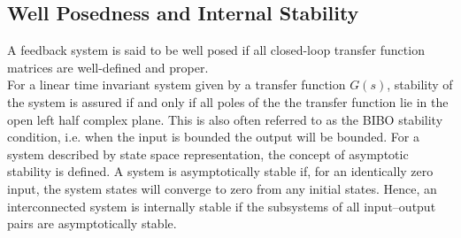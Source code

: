 \documentclass[a4paper,12pt]{article}
\newcommand\norm[1]{\left\lVert#1\right\rVert}
\begin{document}
		\subsection{Well Posedness and Internal Stability}
		A feedback system is said to be well posed if all closed-loop transfer function matrices are well-defined and proper. \\
		For a linear time invariant system given by a transfer function $G(s)$, stability of the system is assured if and only if all poles of the the transfer function lie in the open left half complex plane. This is also often referred to as the BIBO stability condition, i.e. when the input is bounded the output will be bounded. For a system described by state space representation, the concept of asymptotic stability is defined. A system is asymptotically stable if, for an identically zero input, the system states will converge to zero from any initial states. Hence, an interconnected system is internally
stable if the subsystems of all input–output pairs are asymptotically stable.
\end{document}
